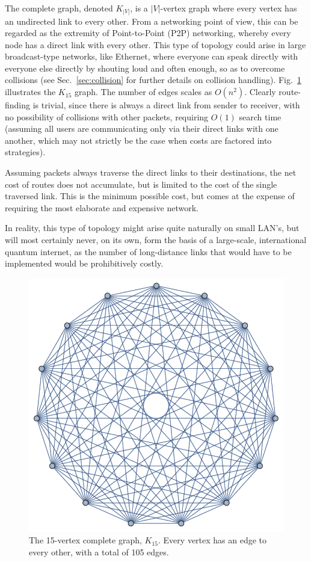 \documentclass[aps,rmp,twocolumn,amsmath,amssymb,nofootinbib,superscriptaddress]{revtex4}
\begin{document}
The complete graph, denoted $K_{|V|}$, is a $|V|$-vertex graph where every vertex has an undirected link to every other. From a networking point of view, this can be regarded as the extremity of Point-to-Point (P2P) networking, whereby every node has a direct link with every other. This type of topology could arise in large broadcast-type networks, like Ethernet, where everyone can speak directly with everyone else directly by shouting loud and often enough, so as to overcome collisions (see Sec.~\ref{sec:collision} for further details on collision handling). Fig.~\ref{fig:complete_graph} illustrates the $K_{15}$ graph. The number of edges scales as $O(n^2)$. Clearly route-finding is trivial, since there is always a direct link from sender to receiver, with no possibility of collisions with other packets, requiring $O(1)$ search time (assuming all users are communicating only via their direct links with one another, which may not strictly be the case when costs are factored into strategies).

Assuming packets always traverse the direct links to their destinations, the net cost of routes does not accumulate, but is limited to the cost of the single traversed link. This is the minimum possible cost, but comes at the expense of requiring the most elaborate and expensive network.

In reality, this type of topology might arise quite naturally on small LAN's, but will most certainly never, on its own, form the basis of a large-scale, international quantum internet, as the number of long-distance links that would have to be implemented would be prohibitively costly.

\begin{figure}[!htb]
\includegraphics[width=0.7\columnwidth]{K_15}
\caption{The 15-vertex complete graph, $K_{15}$. Every vertex has an edge to every other, with a total of 105 edges.} \label{fig:complete_graph}
\end{figure}
\end{document}
